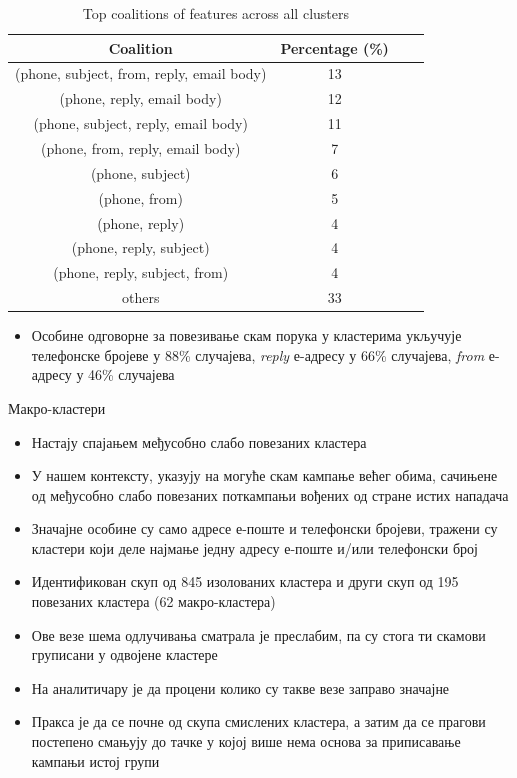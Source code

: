 \documentclass[compress, containsverbatim,mathserif, xcolor=dvipsnames, unicode]{beamer}
\begin{document}
\begin{frame}
\begin{table}[h!]
\begin{center}
\caption{Top coalitions of features across all clusters}
\begin{tabular}{|c|c|c|c|} \hline
\textbf{Coalition} & \textbf{Percentage (\%)}\\ \hline
(phone, subject, from, reply, email body) & 13\\ \hline
(phone, reply, email body) & 12\\ \hline
(phone, subject, reply, email body) & 11\\ \hline
(phone, from, reply, email body) & 7\\ \hline
(phone, subject) & 6\\ \hline
(phone, from) & 5\\ \hline
(phone, reply) & 4\\ \hline
(phone, reply, subject) & 4\\ \hline
(phone, reply, subject, from) & 4\\ \hline
others & 33\\ \hline
\end{tabular}
\label{tab:tabela5}
\end{center}
\end{table}
\begin{itemize}
	\item Особине одговорне за повезивање скам порука у кластерима укључује телефонске бројеве у 88\% случајева, \emph{reply} е-адресу у 66\% случајева, \emph{from} е-адресу у 46\% случајева	
\end{itemize}
\end{frame}

\begin{frame} {Макро-кластери}
\begin{itemize}
	\item Настају спајањем међусобно слабо повезаних кластера
	\item У нашем контексту, указују на могуће скам кампање већег обима, сачињене од међусобно слабо повезаних поткампањи вођених од стране истих нападача
	\item Значајне особине су само адресе е-поште и телефонски бројеви, тражени су кластери који деле најмање једну адресу е-поште и/или телефонски број
	\item Идентификован скуп од 845 изолованих кластера и други скуп од 195 повезаних кластера (62 макро-кластера)
	\item Ове везе шема одлучивања сматрала је преслабим, па су стога ти скамови груписани у одвојене кластере
	\item На аналитичару је да процени колико су такве везе заправо значајне
	\item Пракса је да се почне од скупа смислених кластера, а затим да се прагови постепено смањују до тачке у којој више нема основа за приписавање кампањи истој групи

\end{itemize}
\end{frame}
\end{document}
